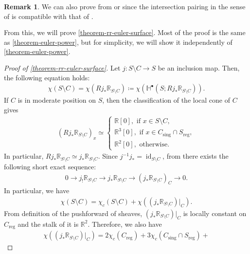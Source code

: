 \documentclass[a4paper,dvipdfmx,reqno,12pt]{amsart}
\theoremstyle{definition}
\newtheorem{remark}[theorem]{Remark}
\newcommand{\deq}{\coloneqq}
\newcommand{\opn}[1]{\operatorname{#1}}
\numberwithin{equation}{section}
\begin{document}
\begin{remark}
We can also prove from \cite[Theorem 4.2]{MR3032930}
or \cite[Theorem 4.11]{shaw2015tropical}
since the intersection pairing in the sense of
\cite{MR4637248} is compatible with that of
\cite{shaw2015tropical,demedrano2023chern}. 
\end{remark}

From this, we will prove \cref{theorem-rr-euler-surface}.
Most of the proof is the same as \cref{theorem-euler-power},
but for simplicity,
we will show it independently of \cref{theorem-euler-power}.

\begin{proof}[{Proof of \cref{theorem-rr-euler-surface}}]
Let
$j\colon S\setminus C\to S$ be an inclusion map.
Then, the following equation holds:
\begin{align}
\chi(S\setminus C)=\chi(Rj_*\mathbb{R}_{S\setminus C})
\deq \chi(\mathbb{H}^{\bullet}(S;Rj_*\mathbb{R}_{S\setminus C})).
\end{align}
If $C$ is in moderate position on $S$, then
the classification of the local cone of $C$ gives 
\begin{align}
(Rj_*\mathbb{R}_{S\setminus C})_x
\simeq
\begin{cases}
\mathbb{R}[0], \text{ if } x\in S\setminus C, \\
\mathbb{R}^3[0], \text{ if } x\in C_{\mathrm{sing}}
\cap S_{\mathrm{reg}}, \\
\mathbb{R}^2[0], \text{ otherwise.}  
\end{cases}  
\end{align}
In particular, $Rj_*\mathbb{R}_{S\setminus C}\simeq
j_*\mathbb{R}_{S\setminus C}$.
Since $j^{-1}j_*=\opn{id}_{S\setminus C}$,  
from \cite[Proposition 2.3.6 (v)]{MR1299726}
there exists the following short exact sequence:
\begin{align}
0\to j_!\mathbb{R}_{S\setminus C} 
\to j_* \mathbb{R}_{S\setminus C}
\to (j_*\mathbb{R}_{S\setminus C})_{C} \to 0.
\end{align}
In particular, we have
\begin{align}
\chi(S\setminus C)=
\chi_c(S\setminus C)+\chi((j_*\mathbb{R}_{S\setminus C})|_C).
\end{align}
From definition of the pushforward of sheaves, 
$(j_*\mathbb{R}_{S\setminus C})|_C$ is locally constant 
on $C_{\opn{reg}}$ and the stalk of it is $\mathbb{R}^2$.
Therefore, we also have
\begin{align}
\chi((j_*\mathbb{R}_{S\setminus C})|_C)=
2\chi_c(C_{\mathrm{reg}})+
3\chi_c(C_{\mathrm{sing}}\cap S_{\mathrm{reg}})+

\end{align}
\end{proof}
\end{document}
